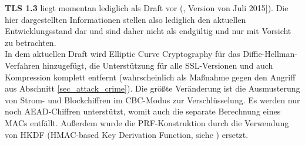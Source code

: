 \textbf{TLS 1.3} liegt momentan lediglich als Draft vor (\cite{tls13}, Version von Juli 2015]). Die hier dargestellten Informationen stellen also lediglich den aktuellen Entwicklungsstand dar und sind daher nicht als endgültig und nur mit Vorsicht zu betrachten.\\
In dem aktuellen Draft wird Elliptic Curve Cryptography für das Diffie-Hellman-Verfahren hinzugefügt, die Unterstützung für alle SSL-Versionen und auch Kompression komplett entfernt (wahrscheinlich als Maßnahme gegen den Angriff aus Abschnitt \ref{sec_attack_crime}). Die größte Veränderung ist die Ausmusterung von Strom- und Blockchiffren im CBC-Modus zur Verschlüsselung. Es werden nur noch AEAD-Chiffren unterstützt, womit auch die separate Berechnung eines MACs entfällt. Außerdem wurde die PRF-Konstruktion durch die Verwendung von HKDF (HMAC-based Key Derivation Function, siehe \cite{krawczyk10}) ersetzt.



